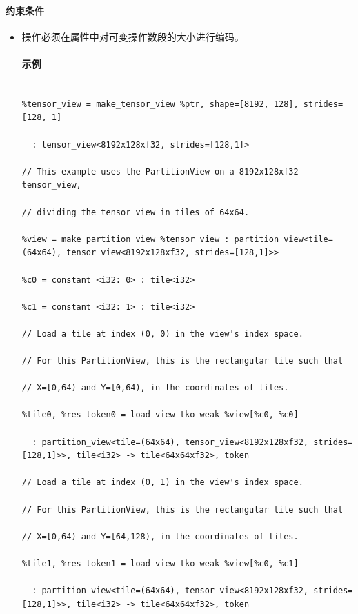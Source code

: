 \documentclass{article}
\begin{document}
\paragraph{约束条件}


\begin{itemize}
\item 操作必须在属性中对可变操作数段的大小进行编码。




\paragraph{示例}


\begin{lstlisting}

%tensor_view = make_tensor_view %ptr, shape=[8192, 128], strides=[128, 1]

  : tensor_view<8192x128xf32, strides=[128,1]>

// This example uses the PartitionView on a 8192x128xf32 tensor_view,

// dividing the tensor_view in tiles of 64x64.

%view = make_partition_view %tensor_view : partition_view<tile=(64x64), tensor_view<8192x128xf32, strides=[128,1]>>

%c0 = constant <i32: 0> : tile<i32>

%c1 = constant <i32: 1> : tile<i32>

// Load a tile at index (0, 0) in the view's index space.

// For this PartitionView, this is the rectangular tile such that

// X=[0,64) and Y=[0,64), in the coordinates of tiles.

%tile0, %res_token0 = load_view_tko weak %view[%c0, %c0]

  : partition_view<tile=(64x64), tensor_view<8192x128xf32, strides=[128,1]>>, tile<i32> -> tile<64x64xf32>, token

// Load a tile at index (0, 1) in the view's index space.

// For this PartitionView, this is the rectangular tile such that

// X=[0,64) and Y=[64,128), in the coordinates of tiles.

%tile1, %res_token1 = load_view_tko weak %view[%c0, %c1]

  : partition_view<tile=(64x64), tensor_view<8192x128xf32, strides=[128,1]>>, tile<i32> -> tile<64x64xf32>, token


\end{lstlisting}
\end{itemize}
\end{document}
